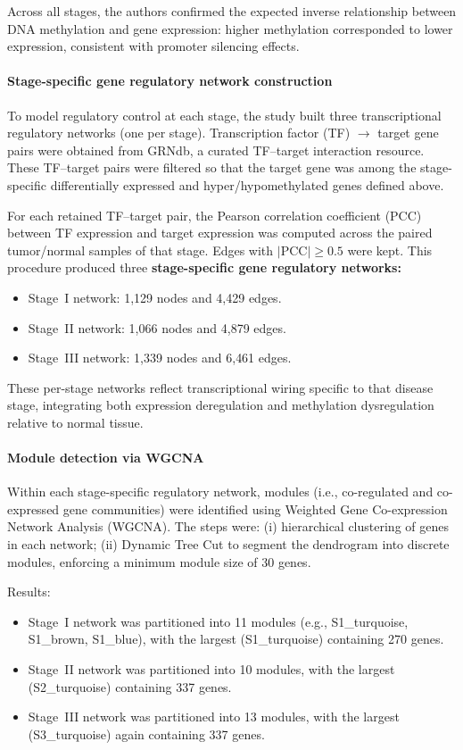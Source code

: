 \documentclass[10pt]{extarticle}
\begin{document}
Across all stages, the authors confirmed the expected inverse relationship between DNA methylation and gene expression: higher methylation corresponded to lower expression, consistent with promoter silencing effects.

\paragraph{Stage-specific gene regulatory network construction}
To model regulatory control at each stage, the study built three transcriptional regulatory networks (one per stage). Transcription factor (TF) $\rightarrow$ target gene pairs were obtained from GRNdb, a curated TF--target interaction resource. These TF--target pairs were filtered so that the target gene was among the stage-specific differentially expressed and hyper/hypomethylated genes defined above.

For each retained TF--target pair, the Pearson correlation coefficient (PCC) between TF expression and target expression was computed across the paired tumor/normal samples of that stage. Edges with $|\text{PCC}| \ge 0.5$ were kept. This procedure produced three \textbf{stage-specific gene regulatory networks:}
\begin{itemize}[label=-]
    \item Stage~I network: 1{,}129 nodes and 4{,}429 edges.
    \item Stage~II network: 1{,}066 nodes and 4{,}879 edges.
    \item Stage~III network: 1{,}339 nodes and 6{,}461 edges.
\end{itemize}
These per-stage networks reflect transcriptional wiring specific to that disease stage, integrating both expression deregulation and methylation dysregulation relative to normal tissue.

\paragraph{Module detection via WGCNA}
Within each stage-specific regulatory network, modules (i.e., co-regulated and co-expressed gene communities) were identified using Weighted Gene Co-expression Network Analysis (WGCNA). The steps were: (i) hierarchical clustering of genes in each network; (ii) Dynamic Tree Cut to segment the dendrogram into discrete modules, enforcing a minimum module size of 30 genes.

Results:
\begin{itemize}[label=-]
    \item Stage~I network was partitioned into 11 modules (e.g., S1\_turquoise, S1\_brown, S1\_blue), with the largest (S1\_turquoise) containing 270 genes.
    \item Stage~II network was partitioned into 10 modules, with the largest (S2\_turquoise) containing 337 genes.
    \item Stage~III network was partitioned into 13 modules, with the largest (S3\_turquoise) again containing 337 genes.
\end{itemize}
\end{document}
